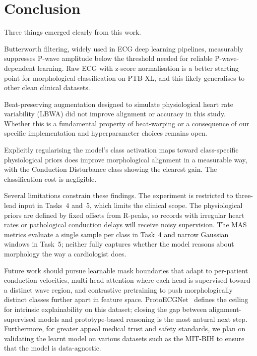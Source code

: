 \documentclass{article}
\begin{document}
\FloatBarrier
\section{Conclusion}

Three things emerged clearly from this work.

Butterworth filtering, widely used in ECG deep learning pipelines,
measurably suppresses P-wave amplitude below the threshold needed for
reliable P-wave-dependent learning. Raw ECG with z-score normalisation
is a better starting point for morphological classification on PTB-XL,
and this likely generalises to other clean clinical datasets.

Beat-preserving augmentation designed to simulate physiological heart
rate variability (LBWA) did not improve alignment or accuracy in this
study. Whether this is a fundamental property of beat-warping or a
consequence of our specific implementation and hyperparameter choices
remains open.

Explicitly regularising the model's class activation maps toward
class-specific physiological priors does improve morphological
alignment in a measurable way, with the Conduction Disturbance class
showing the clearest gain. The classification cost is negligible.

Several limitations constrain these findings. The experiment is
restricted to three-lead input in Tasks~4 and~5, which limits the
clinical scope. The physiological priors are defined by fixed offsets
from R-peaks, so records with irregular heart rates or pathological
conduction delays will receive noisy supervision. The MAS metrics
evaluate a single sample per class in Task~4 and narrow Gaussian
windows in Task~5; neither fully captures whether the model reasons
about morphology the way a cardiologist does.

Future work should pursue learnable mask boundaries that adapt to
per-patient conduction velocities, multi-head attention where each
head is supervised toward a distinct wave region, and contrastive
pretraining to push morphologically distinct classes further apart in
feature space. ProtoECGNet~\cite{sethi2025} defines the ceiling for
intrinsic explainability on this dataset; closing the gap between
alignment-supervised models and prototype-based reasoning is the
most natural next step. Furthermore, for greater appeal medical trust and safety standards, we plan on validating the learnt model on various datasets such as the MIT-BIH to ensure that the model is data-agnostic.

\clearpage


\end{document}
